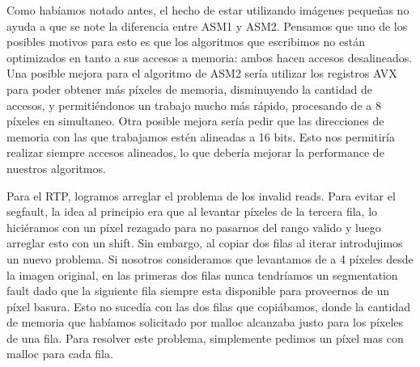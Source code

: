 Como habíamos notado antes, el hecho de estar utilizando imágenes pequeñas no ayuda a que se note la diferencia entre ASM1 y ASM2. Pensamos que uno de los posibles motivos para esto es que los algoritmos que escribimos no están optimizados en tanto a sus accesos a memoria: ambos hacen accesos desalineados. Una posible mejora para el algoritmo de ASM2 sería utilizar los registros AVX para poder obtener más píxeles de memoria, disminuyendo la cantidad de accesos, y permitiéndonos un trabajo mucho más rápido, procesando de a 8 píxeles en simultaneo. Otra posible mejora sería pedir que las direcciones de memoria con las que trabajamos estén alineadas a 16 bits. Esto nos permitiría realizar siempre accesos alineados, lo que debería mejorar la performance de nuestros algoritmos.

Para el RTP, logramos arreglar el problema de los invalid reads. Para evitar el segfault, la idea al principio era que al levantar píxeles de la tercera fila, lo hiciéramos con un píxel rezagado para no pasarnos del rango valido y luego arreglar esto con un shift. Sin embargo, al copiar dos filas al iterar introdujimos un nuevo problema. Si nosotros consideramos que levantamos de a 4 píxeles desde la imagen original, en las primeras dos filas nunca tendríamos un segmentation fault dado que la siguiente fila siempre esta disponible para proveernos de un píxel basura. Esto no sucedía con las dos filas que copiábamos, donde la cantidad de memoria que habíamos solicitado por malloc alcanzaba justo para los píxeles de una fila. Para resolver este problema, simplemente pedimos un píxel mas con malloc para cada fila.